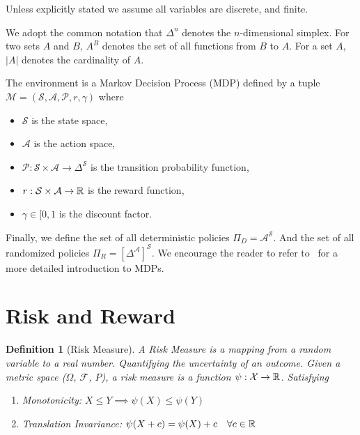 \documentclass[10pt]{article}
\newtheorem{definition}{Definition}
\renewcommand{\cite}{\citep}
\theoremstyle{plain}
\theoremstyle{remark}
\begin{document}
Unless explicitly stated we assume all variables are discrete, and finite.

We adopt the common notation that $\Delta^n$ denotes the $n$-dimensional simplex. For two sets $A$ and $B$, $A^B$ denotes the set of all functions from $B$ to $A$. For a set $A$, $|A|$ denotes the cardinality of $A$.

The environment is a Markov Decision Process (MDP) defined by a tuple $\mathcal{M} = (\mathcal{S}, \mathcal{A}, \mathcal{P}, r, \gamma)$ where
\begin{itemize}
        \item $\mathcal{S}$ is the state space,
        \item $\mathcal{A}$ is the action space,
        \item $\mathcal{P} : \mathcal{S} \times \mathcal{A} \to \Delta^\mathcal{S}$ is the transition probability function,
        \item $r : \mathcal{S} \times \mathcal{A} \to \mathbb{R}$ is the reward function,
        \item $\gamma \in [0, 1$ is the discount factor.
\end{itemize} 
Finally, we define the set of all deterministic policies $\Pi_D = \mathcal{A}^\mathcal{S}$. 
And the set of all randomized policies $\Pi_R = [\Delta^\mathcal{A}]^\mathcal{S}$.
We encourage the reader to refer to~\cite{Puterman1994} for a more detailed introduction to MDPs.

\section{Risk and Reward}

\begin{definition}[Risk Measure]
        \label{def:risk}
        A Risk Measure is a mapping from a random variable to a real number. Quantifying the uncertainty of an outcome.
        Given a metric space ($\Omega$, $\mathcal{F}$, $P$), a risk measure is a function $\psi: \mathcal{X} \to \mathbb{R}$. Satisfying
        \begin{enumerate}
                \item Monotonicity: $X \leq Y \implies \psi(X) \leq \psi(Y)$
                \item Translation Invariance: $\psi(X + c) = \psi(X) + c \quad \forall c \in \mathbb{R}$
        \end{enumerate}
\end{definition}
\end{document}
